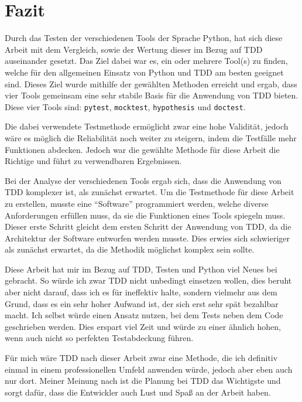 \section{Fazit}\label{fazit}

Durch das Testen der verschiedenen Tools der Sprache Python, hat sich diese
Arbeit mit dem Vergleich, sowie der Wertung dieser im Bezug auf TDD auseinander
gesetzt. Das Ziel dabei war es, ein oder mehrere Tool(s) zu finden, welche für
den allgemeinen Einsatz von Python und TDD am besten geeignet sind. Dieses
Ziel wurde mithilfe der gewählten Methoden erreicht und ergab, dass vier Tools
gemeinsam eine sehr stabile Basis für die Anwendung von TDD bieten. Diese vier
Tools sind: \lstinline{pytest}, \lstinline{mocktest}, \lstinline{hypothesis} und
\lstinline{doctest}.

Die dabei verwendete Testmethode ermöglicht zwar eine hohe Validität, jedoch
wäre es möglich die Reliabilität noch weiter zu steigern, indem die Testfälle
mehr Funktionen abdecken. Jedoch war die gewählte Methode für diese Arbeit die
Richtige und führt zu verwendbaren Ergebnissen.

Bei der Analyse der verschiedenen Tools ergab sich, dass die Anwendung von TDD 
komplexer ist, als zunächst erwartet. Um die Testmethode für diese Arbeit zu 
erstellen, musste eine "`Software"' programmiert werden, welche diverse 
Anforderungen erfüllen muss, da sie die Funktionen eines Tools spiegeln muss. 
Dieser erste Schritt gleicht dem ersten Schritt der Anwendung von 
TDD, da die Architektur der Software entworfen werden musste. Dies erwies sich 
schwieriger als zunächst erwartet, da die Methodik möglichst komplex sein 
sollte.

Diese Arbeit hat mir im Bezug auf TDD, Testen und Python viel Neues bei
gebracht. So würde ich zwar TDD nicht unbedingt einsetzen wollen, dies beruht
aber nicht darauf, dass ich es für ineffektiv halte, sondern vielmehr aus dem
Grund, dass es ein sehr hoher Aufwand ist, der sich erst sehr spät bezahlbar
macht. Ich selbst würde einen Ansatz nutzen, bei dem Tests neben dem 
Code geschrieben werden. Dies erspart viel Zeit und würde zu einer ähnlich 
hohen, wenn auch nicht so perfekten Testabdeckung führen.

Für mich wäre TDD nach dieser Arbeit zwar eine Methode, die ich definitiv 
einmal in einem professionellen Umfeld anwenden würde, jedoch aber eben auch 
nur dort. Meiner Meinung nach ist die Planung bei TDD das Wichtigste und sorgt 
dafür, dass die Entwickler auch Lust und Spaß an der Arbeit haben.